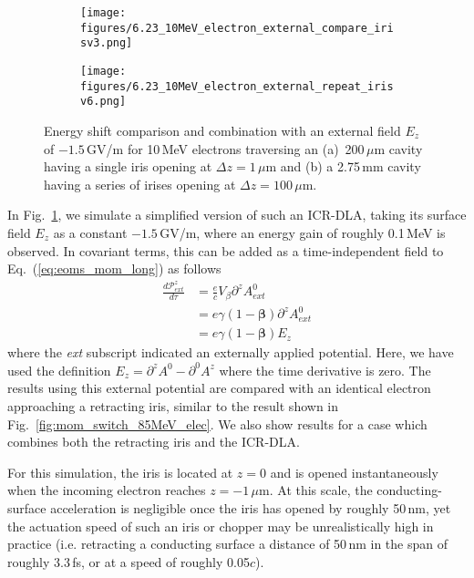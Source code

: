 \documentclass[reprint,
               amsmath,amssymb,nofootinbib, aps%
              ]{revtex4-2}
\begin{document}
\begin{figure}
  \begin{subfigure}{\columnwidth}
    \centering
    \texttt{[image: figures/6.23\_10MeV\_electron\_external\_compare\_irisv3.png]}
    \caption{}
    \label{fig:external_DLA_vs_iris_single}
  \end{subfigure}

  \begin{subfigure}{\columnwidth}
    \centering
    \texttt{[image: figures/6.23\_10MeV\_electron\_external\_repeat\_irisv6.png]}
    \caption{}
    \label{fig:external_DLA_vs_iris_repeat}
  \end{subfigure}
  \vspace{-1\baselineskip}
  \caption{Energy shift comparison and combination with an external field $E_z$ of $-1.5$\,GV/m for 10\,MeV electrons traversing an (a)~200\,{${\mu}$}m cavity having a single iris opening at $\Delta z = 1\,\mu$m and (b) a 2.75\,mm cavity having a series of irises opening at $\Delta z = 100\,\mu$m.}
  \label{fig:external_DLA_vs_iris}
\end{figure}

In Fig.~\ref{fig:external_DLA_vs_iris_single}, we simulate a simplified version of such an ICR-DLA, taking its surface field $E_z$ as a constant $-1.5$\,GV/m, where an energy gain of roughly 0.1\,MeV is observed. In covariant terms, this can be added as a time-independent field to Eq.~(\ref{eq:eoms_mom_long}) as follows
\begin{align}
    \frac{d \mathcal{P}^z_{ext}}{d \tau} &= \frac{e}{c}V_{\beta}\partial^z A^0_{ext}
    \nonumber \\
    &=  e\gamma\left(1-\boldsymbol{\beta}\right)\partial^z A^0_{ext}
    \nonumber \\
    &=  e\gamma\left(1-\boldsymbol{\beta}\right)E_z
\end{align}
\noindent where the \textit{ext} subscript indicated an externally applied potential. Here, we have used the definition $E_z = \partial^z A^0 - \partial^0 A^z$ where the time derivative is zero. The results using this external potential are compared with an identical electron approaching a retracting iris, similar to the result shown in Fig.~\ref{fig:mom_switch_85MeV_elec}. We also show results for a case which combines both the retracting iris and the ICR-DLA.

For this simulation, the iris is located at $z=0$ and is opened instantaneously when the incoming electron reaches $z=-1$\,${\mu}$m. At this scale, the conducting-surface acceleration is negligible once the iris has opened by roughly 50\,nm, yet the actuation speed of such an iris or chopper may be unrealistically high in practice (i.e. retracting a conducting surface a distance of 50\,nm in the span of roughly 3.3\,fs, or at a speed of roughly 0.05$c$).
\end{document}
